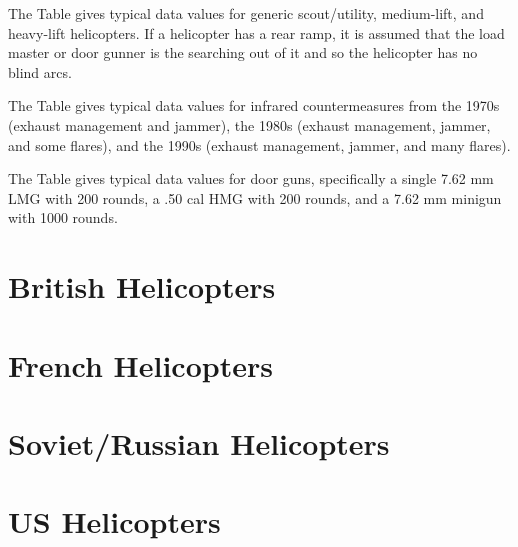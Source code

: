 \documentclass[10pt]{article}
\begin{document}
The Table gives typical data values for generic scout/utility, medium-lift, and heavy-lift helicopters. If a helicopter has a rear ramp, it is assumed that the load master or door gunner is the searching out of it and so the helicopter has no blind arcs.

The Table gives typical data values for infrared countermeasures from the 1970s (exhaust management and jammer), the 1980s (exhaust management, jammer, and some flares), and the 1990s (exhaust management, jammer, and many flares).

The Table gives typical data values for door guns, specifically a single 7.62 mm LMG with 200 rounds, a .50 cal HMG with 200 rounds, and a 7.62 mm minigun with 1000 rounds.


\section{British Helicopters}








\section{French Helicopters}






\section{Soviet/Russian Helicopters}






\section{US Helicopters}











\end{document}

